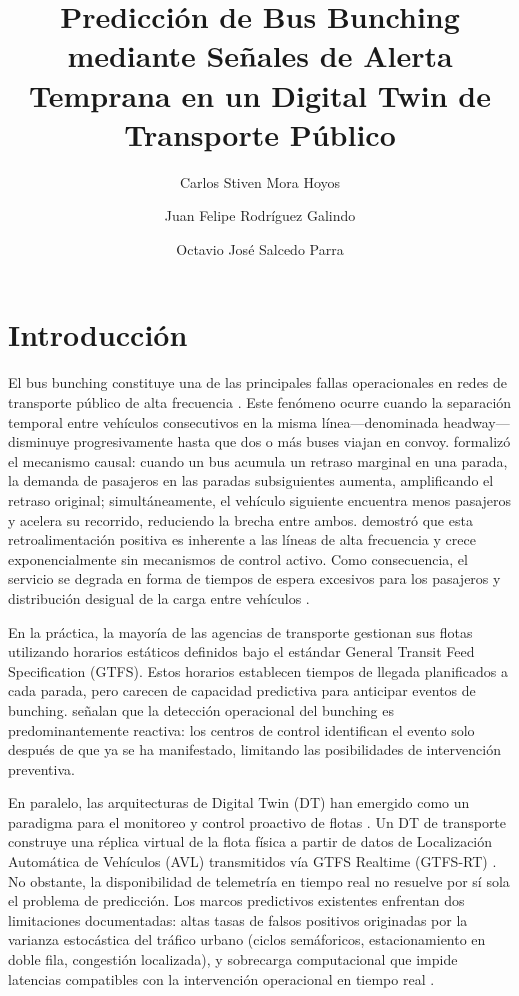 \documentclass[fleqn,10pt,lineno]{wlpeerj}
\title{Predicci\'on de Bus Bunching mediante Se\~nales de Alerta Temprana en un Digital Twin de Transporte P\'ublico}
\author[1]{Carlos Stiven Mora Hoyos}
\author[1]{Juan Felipe Rodr\'iguez Galindo}
\author[1]{Octavio Jos\'e Salcedo Parra}
\affil[1]{Facultad de Ingenier\'ia, Maestr\'ia en Ciencias de la Informaci\'on y las Comunicaciones, Universidad Distrital Francisco Jos\'e de Caldas, Bogot\'a, Colombia}
\begin{document}
\flushbottom
\maketitle
\thispagestyle{empty}

\section{Introducci\'on}

El bus bunching constituye una de las principales fallas operacionales en redes de transporte p\'ublico de alta frecuencia \citep{1,21}. Este fen\'omeno ocurre cuando la separaci\'on temporal entre veh\'iculos consecutivos en la misma l\'inea---denominada headway---disminuye progresivamente hasta que dos o m\'as buses viajan en convoy. \citet{1} formaliz\'o el mecanismo causal: cuando un bus acumula un retraso marginal en una parada, la demanda de pasajeros en las paradas subsiguientes aumenta, amplificando el retraso original; simult\'aneamente, el veh\'iculo siguiente encuentra menos pasajeros y acelera su recorrido, reduciendo la brecha entre ambos. \citet{2} demostr\'o que esta retroalimentaci\'on positiva es inherente a las l\'ineas de alta frecuencia y crece exponencialmente sin mecanismos de control activo. Como consecuencia, el servicio se degrada en forma de tiempos de espera excesivos para los pasajeros y distribuci\'on desigual de la carga entre veh\'iculos \citep{3}.

En la pr\'actica, la mayor\'ia de las agencias de transporte gestionan sus flotas utilizando horarios est\'aticos definidos bajo el est\'andar General Transit Feed Specification (GTFS). Estos horarios establecen tiempos de llegada planificados a cada parada, pero carecen de capacidad predictiva para anticipar eventos de bunching. \citet{21} se\~nalan que la detecci\'on operacional del bunching es predominantemente reactiva: los centros de control identifican el evento solo despu\'es de que ya se ha manifestado, limitando las posibilidades de intervenci\'on preventiva.

En paralelo, las arquitecturas de Digital Twin (DT) han emergido como un paradigma para el monitoreo y control proactivo de flotas \citep{5,6}. Un DT de transporte construye una r\'eplica virtual de la flota f\'isica a partir de datos de Localizaci\'on Autom\'atica de Veh\'iculos (AVL) transmitidos v\'ia GTFS Realtime (GTFS-RT) \citep{7}. No obstante, la disponibilidad de telemetr\'ia en tiempo real no resuelve por s\'i sola el problema de predicci\'on. Los marcos predictivos existentes enfrentan dos limitaciones documentadas: altas tasas de falsos positivos originadas por la varianza estoc\'astica del tr\'afico urbano (ciclos sem\'aforicos, estacionamiento en doble fila, congesti\'on localizada), y sobrecarga computacional que impide latencias compatibles con la intervenci\'on operacional en tiempo real \citep{8,9}.
\end{document}
